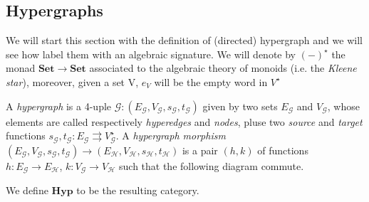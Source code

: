 \documentclass[runningheads,envcountsect]{lmcs}
\newcommand{\hyp}{\catname{Hyp}}
\newcommand{\catname}[1]{\mathbf{#1}}
\theoremstyle{plain}
\theoremstyle{definition}
\begin{document}
\subsection{Hypergraphs}\label{sub:hyper}
We will start this section with the definition of (directed) hypergraph and we will see how label them with an algebraic signature. We will denote by $(-)^\star$ the monad $\catname{Set}\to \catname{Set}$ associated to the algebraic theory of monoids (i.e. the \emph{Kleene star}), moreover, given a set V, $e_V$ will be the empty word in $V^{\star}$ 


\begin{defi}A \emph{hypergraph} is a 4-uple $\mathcal{G}:(E_\mathcal{G}, V_\mathcal{G}, s_\mathcal{G}, t_\mathcal{G})$ given by two sets $E_\mathcal{G}$ and $V_\mathcal{G}$, whose elements are called respectively \emph{hyperedges} and \emph{nodes}, pluse two \emph{source} and \emph{target}  functions $s_\mathcal{G}, t_\mathcal{G}:E_\mathcal{G}\rightrightarrows V_\mathcal{G}^\star$. A \emph{hypergraph morphism} $(E_\mathcal{G}, V_\mathcal{G}, s_\mathcal{G}, t_\mathcal{G})\to (E_\mathcal{H}, V_\mathcal{H}, s_\mathcal{H}, t_\mathcal{H})$ is a pair $(h,k)$ of functions $h:E_\mathcal{G}\to E_\mathcal{H}$, $k:V_\mathcal{G}\to V_\mathcal{H}$ such that the following diagram commute.
	 \begin{center}
	 \end{center}	 
 We define $\hyp$ to be the resulting category.
\end{defi}
\end{document}
